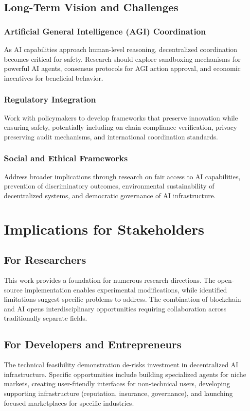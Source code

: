 \subsection{Long-Term Vision and Challenges}

\subsubsection{Artificial General Intelligence (AGI) Coordination}
As AI capabilities approach human-level reasoning, decentralized coordination becomes critical for safety. Research should explore sandboxing mechanisms for powerful AI agents, consensus protocols for AGI action approval, and economic incentives for beneficial behavior.

\subsubsection{Regulatory Integration}
Work with policymakers to develop frameworks that preserve innovation while ensuring safety, potentially including on-chain compliance verification, privacy-preserving audit mechanisms, and international coordination standards.

\subsubsection{Social and Ethical Frameworks}
Address broader implications through research on fair access to AI capabilities, prevention of discriminatory outcomes, environmental sustainability of decentralized systems, and democratic governance of AI infrastructure.

\section{Implications for Stakeholders}

\subsection{For Researchers}
This work provides a foundation for numerous research directions. The open-source implementation enables experimental modifications, while identified limitations suggest specific problems to address. The combination of blockchain and AI opens interdisciplinary opportunities requiring collaboration across traditionally separate fields.

\subsection{For Developers and Entrepreneurs}
The technical feasibility demonstration de-risks investment in decentralized AI infrastructure. Specific opportunities include building specialized agents for niche markets, creating user-friendly interfaces for non-technical users, developing supporting infrastructure (reputation, insurance, governance), and launching focused marketplaces for specific industries.

